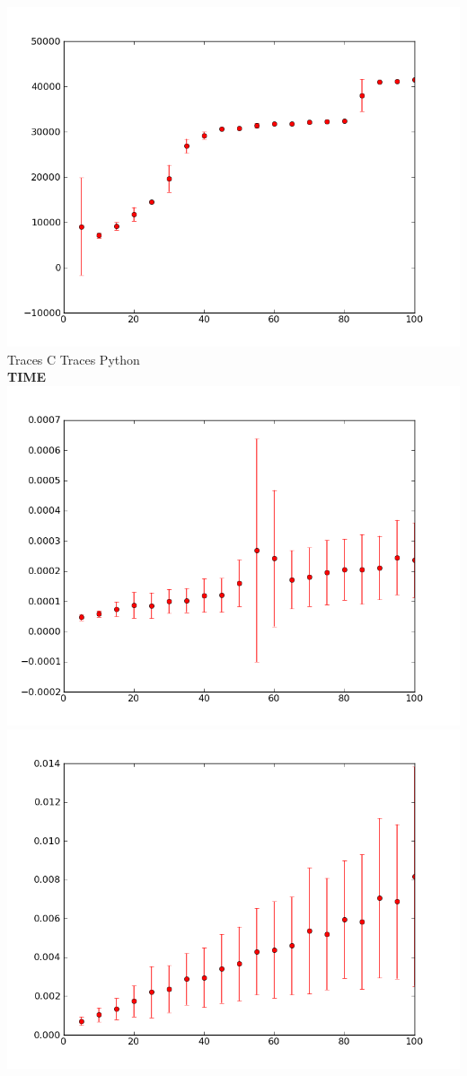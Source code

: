 \documentclass[10pt]{article}
\begin{document}
\begin{center}
\includegraphics[scale=0.4]{../graphs/categorical/categorical-traces-py-space.png} \\
Traces C \qquad\qquad\qquad\qquad\qquad\qquad \qquad Traces Python \\
\pagebreak
{\bf TIME} \\
\includegraphics[scale=0.4]{../graphs/categorical/categorical-reduced-c-time.png} 
\includegraphics[scale=0.4]{../graphs/categorical/categorical-reduced-py-time.png} \\

\end{center}
\end{document}
